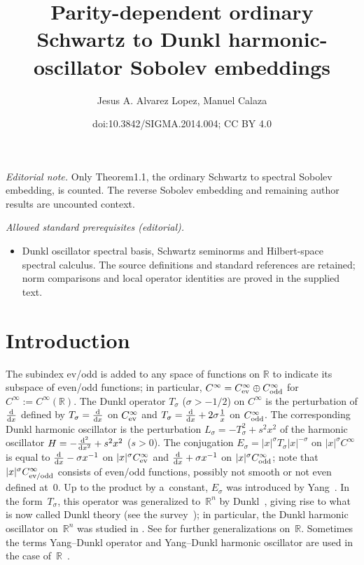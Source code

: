 \documentclass[11pt]{article}
\title{Parity-dependent ordinary Schwartz to Dunkl harmonic-oscillator Sobolev embeddings}
\author{Jesus A. Alvarez Lopez, Manuel Calaza}
\date{doi:10.3842/SIGMA.2014.004; CC BY 4.0}
\newcommand{\R}{\mathbb{R}}
\newcommand{\Cinf}{C^\infty}
\begin{document}
\maketitle
\noindent\textit{Editorial note.} Only Theorem1.1, the ordinary Schwartz to spectral Sobolev embedding, is counted. The reverse Sobolev embedding and remaining author results are uncounted context.\par\medskip
\noindent\textit{Allowed standard prerequisites (editorial).}\begin{itemize}
\item Dunkl oscillator spectral basis, Schwartz seminorms and Hilbert-space spectral calculus. The source definitions and standard references are retained; norm comparisons and local operator identities are proved in the supplied text.
\end{itemize}\medskip
\section{Introduction} \label{s:intro}

The subindex ev/odd is added to any space of functions on $\R$ to indicate its subspace of even/odd functions; in particular, $\Cinf=\Cinf_{\text{\rm ev}}\oplus\Cinf_{\text{\rm odd}}$ for $\Cinf:=\Cinf(\R)$. The Dunkl operator $T_\sigma$ ($\sigma>-1/2$) on $\Cinf$ is the perturbation of $\frac{{\rm d}}{{\rm d}x}$ def\/ined by $T_\sigma=\frac{{\rm d}}{{\rm d}x}$ on $\Cinf_{\text{\rm ev}}$ and $T_\sigma=\frac{{\rm d}}{{\rm d}x}+2\sigma\frac{1}{x}$ on $\Cinf_{\text{\rm odd}}$. The corresponding Dunkl harmonic oscillator is the perturbation $L_\sigma=-T_\sigma^2+s^2x^2$ of the harmonic oscillator $H=-\frac{{\rm d}^2}{{\rm d}x^2}+s^2x^2$ ($s>0$). The conjugation $E_\sigma=|x|^\sigma T_\sigma|x|^{-\sigma}$ on $|x|^\sigma\Cinf$ is equal to $\frac{{\rm d}}{{\rm d}x}-\sigma x^{-1}$ on $|x|^\sigma\Cinf_{\text{\rm ev}}$ and $\frac{{\rm d}}{{\rm d}x}+\sigma x^{-1}$ on $|x|^\sigma\Cinf_{\text{\rm odd}}$; note that $|x|^\sigma\Cinf_{\text{\rm ev/odd}}$ consists of even/odd functions, possibly not smooth or not even def\/ined at~$0$. Up to the product by a~constant, $E_\sigma$ was introduced by Yang~\cite{Yang1951}. In the form~$T_\sigma$, this operator was generalized to~$\R^n$ by Dunkl~\cite{Dunkl1988,Dunkl1989,Dunkl1991}, giving rise to what is now called Dunkl theory (see the survey~\cite{Rosler2003}); in particular, the Dunkl harmonic oscillator on~$\R^n$ was studied in \cite{Dunkl2002,NowakStempak2009b,NowakStempak2009a, Rosenblum1994}. See \cite{Plyushchay2000} for further generalizations on~$\R$. Sometimes the terms Yang--Dunkl operator and Yang--Dunkl harmonic oscillator are used in the case of~$\R$~\cite{Plyushchay2000}.
\end{document}
